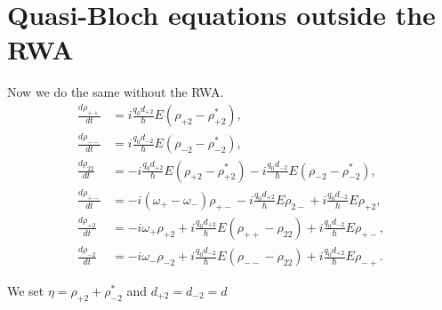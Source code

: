 \documentclass[]{spie}  %
\begin{document}
\section{Quasi-Bloch equations outside the RWA}
Now we do the same without the RWA. 
\begin{align}
\frac{d \rho_{++}}{dt} &= i\frac{q_0d_{+2}}{\hbar}E(\rho_{+2}-\rho_{+2}^*), \\
\frac{d \rho_{--}}{dt} &= i\frac{q_0d_{-2}}{\hbar}E(\rho_{-2}-\rho_{-2}^*), \\
\frac{d \rho_{22}}{dt} &= -i\frac{q_0d_{+2}}{\hbar}E(\rho_{+2}-\rho_{+2}^*)-i\frac{q_0d_{-2}}{\hbar}E(\rho_{-2}-\rho_{-2}^*), \\
\frac{d \rho_{+-}}{dt} &= -i(\omega_+-\omega_{-})\rho_{+-}-i\frac{q_0d_{+2}}{\hbar}E\rho_{2-}+i\frac{q_0d_{-2}}{\hbar}E\rho_{+2},\\
\frac{d \rho_{+2}}{dt} &= -i\omega_+\rho_{+2}+i\frac{q_0d_{+2}}{\hbar}E(\rho_{++}-\rho_{22})+i\frac{q_0d_{-2}}{\hbar}E\rho_{+-},\\
\frac{d \rho_{-2}}{dt} &= -i\omega_-\rho_{-2}+i\frac{q_0d_{-2}}{\hbar}E(\rho_{--}-\rho_{22})+i\frac{q_0d_{+2}}{\hbar}E\rho_{-+}.
\end{align}

We set $\eta = \rho_{+2}+\rho_{-2}^*$ and $d_{+2} = d_{-2} = d$



\acknowledgments %



\end{document}
